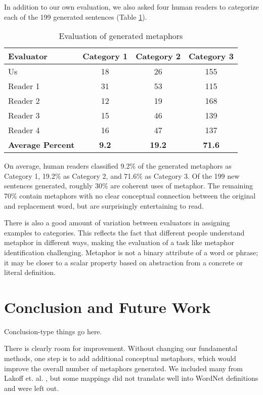 \documentclass[12pt]{article}
\begin{document}
In addition to our own evaluation, we also asked four human readers to categorize each of the 199 generated sentences (Table \ref{tab:catresults}).

\begin{table}[H]
    \centering
    \small
    \begin{tabular}{|l|c|c|c|} \hline
    \textbf{Evaluator} & \textbf{Category 1} & \textbf{Category 2} & \textbf{Category 3} \\ \hline
    Us & 18 & 26 & 155\\ \hline
    Reader 1 & 31 & 53 & 115\\ \hline
    Reader 2 & 12 & 19 & 168\\ \hline
    Reader 3 & 15 & 46 & 139\\ \hline
    Reader 4 & 16 & 47 & 137\\ \hline
    \textbf{Average Percent} & \textbf{9.2} & \textbf{19.2} & \textbf{71.6} \\ \hline
    \end{tabular}
    \caption{Evaluation of generated metaphors}
    \label{tab:catresults}
\end{table}

On average, human readers classified 9.2\% of the generated metaphors as Category 1, 19.2\% as Category 2, and 71.6\% as Category 3. Of the 199 new sentences generated, roughly 30\% are coherent uses of metaphor. The remaining 70\% contain metaphors with no clear conceptual connection between the original and replacement word, but are surprisingly entertaining to read.

There is also a good amount of variation between evaluators in assigning examples to categories. This reflects the fact that different people understand metaphor in different ways, making the evaluation of a task like metaphor identification challenging. Metaphor is not a binary attribute of a word or phrase; it may be closer to a scalar property based on abstraction from a concrete or literal definition.

\section{Conclusion and Future Work}

Conclusion-type things go here.

There is clearly room for improvement.  Without changing our fundamental methods, one step is to add additional conceptual metaphors, which would improve the overall number of metaphors generated. We included many from Lakoff et. al. \cite{lakoff89}, but some mappings did not translate well into WordNet definitions and were left out.
\end{document}
